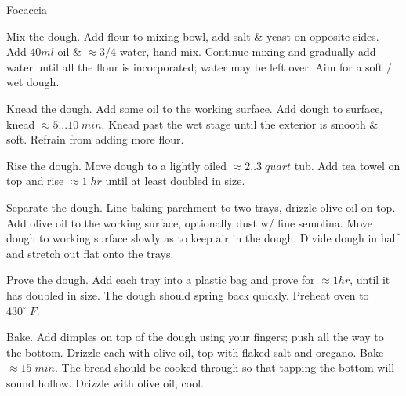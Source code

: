 \begin{recipe}[
preparationtime = 3 hours,
bakingtime = 15 minutes,
source = \citefield{howToBake2013}{title}\cite{howToBake2013}
]
{Focaccia}


\preparation
{

\step Mix the dough.
Add flour to mixing bowl, add salt \& yeast on opposite sides.
Add $40ml$ oil \& $\approx 3/4$ water, hand mix.
Continue mixing and gradually add water until all the flour is incorporated; water may be left over.
Aim for a soft / wet dough.

\step Knead the dough.
Add some oil to the working surface.
Add dough to surface, knead $\approx 5...10\;min$.
Knead past the wet stage until the exterior is smooth \& soft.
Refrain from adding more flour.

\step Rise the dough.
Move dough to a lightly oiled $\approx 2..3\; quart$ tub.
Add tea towel on top and rise $\approx 1\;hr$ until at least doubled in size.

\step Separate the dough.
Line baking parchment to two trays, drizzle olive oil on top.
Add olive oil to the working surface, optionally dust w/ fine semolina.
Move dough to working surface slowly as to keep air in the dough.
Divide dough in half and stretch out flat onto the trays.

\step Prove the dough.
Add each tray into a plastic bag and prove for $\approx 1 hr$, until it has doubled in size.
The dough should spring back quickly.
Preheat oven to $430^\circ \; F$.

\step Bake.
Add dimples on top of the dough using your fingers; push all the way to the bottom.
Drizzle each with olive oil, top with flaked salt and oregano.
Bake $\approx 15 \; min$.
The bread should be cooked through so that tapping the bottom will sound hollow.
Drizzle with olive oil, cool.
}

\end{recipe}
